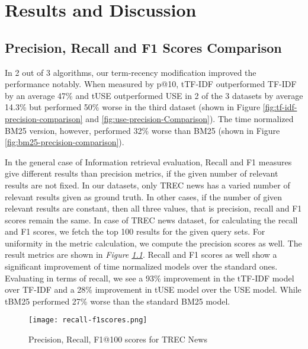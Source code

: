 \chapter{Results and Discussion}
\section{Precision, Recall and F1 Scores Comparison}
In 2 out of 3 algorithms, our term-recency modification improved the performance notably. When measured by p@10, tTF-IDF outperformed TF-IDF by an average 47\% and tUSE outperformed USE in 2 of the 3 datasets by average 14.3\% but performed 50\% worse in the third dataset (shown in Figure \ref{fig:tf-idf-precision-comparison} and \ref{fig:use-precision-Comparison}). The time normalized BM25 version, however, performed 32\% worse than BM25 (shown in Figure \ref{fig:bm25-precision-comparison}). 


In the general case of Information retrieval evaluation, Recall and F1 measures give different results than precision metrics, if the given number of relevant results are not fixed. In our datasets, only TREC news has a varied number of relevant results given as ground truth. In other cases, if the number of given relevant results are constant, then all three values, that is precision, recall and F1 scores remain the same. 
In case of TREC news dataset, for calculating the recall and F1 scores, we fetch the top 100 results for the given query sets. For uniformity in the metric calculation, we compute the precision scores as well. The result metrics are shown in \textit{Figure \ref{fig:recall-f1-metrics}}. Recall and F1 scores as well show a significant improvement of time normalized models over the standard ones. Evaluating in terms of recall, we see a 93\% improvement in the tTF-IDF model over TF-IDF and a 28\% improvement in tUSE model over the USE model. While tBM25 performed 27\% worse than the standard BM25 model.

\begin{figure}
    \centering
    \texttt{[image: recall-f1scores.png]}
    \caption{Precision, Recall, F1@100 scores for TREC News }
    \label{fig:recall-f1-metrics}
\end{figure}

